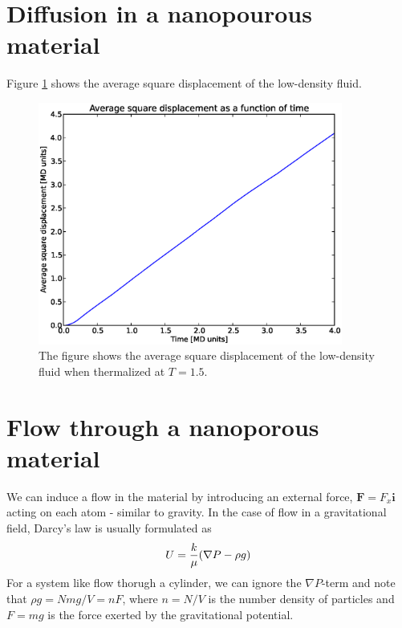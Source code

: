 \documentclass[12pt]{article}
\def\ivec{\textbf{i}}
\begin{document}
 \section{Diffusion in a nanopourous material}
 Figure \ref{fig:6} shows the average square displacement of the low-density fluid.
 
  \begin{figure}
  \centering
  \includegraphics[width=10cm]{avgsqdis.eps}
\caption{\label{fig:6} The figure shows the average square displacement of the low-density fluid when thermalized at $T = 1.5$.}
 \end{figure} 
 
 
 \section{Flow through a nanoporous material}
 We can induce a flow in the material by introducing an external force, $\textbf{F} = F_x \ivec$ acting on each atom - similar to gravity. In the case of flow in a gravitational field, Darcy's law is usually formulated as 
 \begin{equation}
  U = {k\over \mu}(\nabla P - \rho g) 
 \end{equation}
 For a system like flow thorugh a cylinder, we can ignore the $\nabla P$-term and note that $\rho g = Nmg/V = n F$, where $n=N/V$ is the number density of particles and $F = mg$ is the force exerted by the gravitational potential.
 
\end{document}
